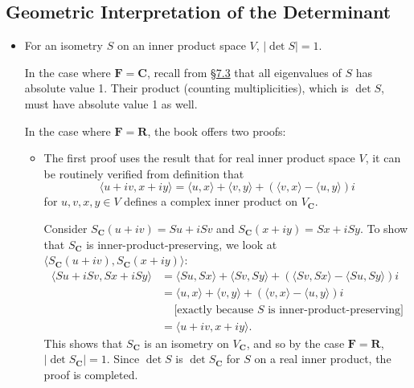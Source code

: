 \documentclass[11pt]{article}
\newcommand{\lk}[2]{\hyperlink{subsection.#1.#2}{\S#1.#2}}
\newcommand{\R}{\mathbf{R}}
\newcommand{\C}{\mathbf{C}}
\newcommand{\F}{\mathbf{F}}
\newcommand{\inp}[2]{\langle #1, #2 \rangle}
\newcommand{\abs}[1]{\lvert #1 \rvert}
\begin{document}
\subsection{Geometric Interpretation of the Determinant}
\begin{itemize}
    \item For an isometry $S$ on an inner product space $V$, $\abs{\det S} = 1$.
    
    In the case where $\F = \C$, recall from \lk{7}{3} that all eigenvalues of $S$ has absolute value 1. Their product (counting multiplicities), which is $\det S$, must have absolute value 1 as well.
    
    In the case where $\F = \R$, the book offers two proofs:
    \begin{itemize}
        \item The first proof uses the result that for real inner product space $V$, it can be routinely verified from definition that \[\inp{u+iv}{x+iy} = \inp{u}{x} + \inp{v}{y} + (\inp{v}{x} - \inp{u}{y})i\] for $u,v,x,y \in V$ defines a complex inner product on $V_\C$.
        
        Consider $S_\C(u+iv) = Su +iSv$ and $S_\C(x+iy) = Sx + iSy$. To show that $S_\C$ is inner-product-preserving, we look at  $\inp{S_\C(u+iv)}{S_\C(x+iy)}$:
        \begin{align*}
            \inp{Su +iSv}{Sx + iSy} & = \inp{Su}{Sx} + \inp{Sv}{Sy} + (\inp{Sv}{Sx} - \inp{Su}{Sy})i \\ & = \inp{u}{x} + \inp{v}{y} + (\inp{v}{x} - \inp{u}{y})i \\ & \quad \, \text{[exactly because $S$ is inner-product-preserving]} \\ & = \inp{u+iv}{x+iy}.
        \end{align*}
        This shows that $S_\C$ is an isometry on $V_\C$, and so by the case $\F = \R$, $\abs{\det S_\C} = 1$. Since $\det S$ is $\det S_\C$ for $S$ on a real inner product, the proof is completed.
        

\end{itemize}
\end{itemize}
\end{document}
